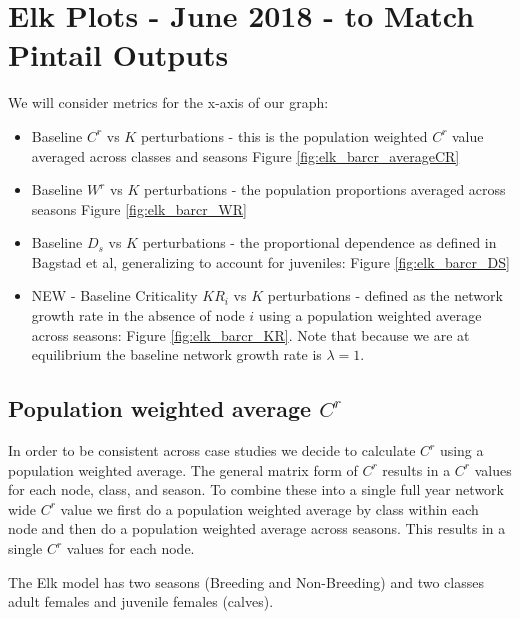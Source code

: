 \documentclass[10pt]{article}
\begin{document}
\section{Elk Plots - June 2018 - to Match Pintail Outputs}

We will consider metrics for the x-axis of our graph:
\begin{itemize}
\item Baseline $C^r$ vs $K$ perturbations - this is the population weighted $C^r$ value averaged across classes and seasons Figure \ref{fig:elk_barcr_averageCR}
\item Baseline $W^r$ vs $K$ perturbations - the population proportions averaged across seasons Figure \ref{fig:elk_barcr_WR}
\item Baseline $D_s$ vs $K$ perturbations - the proportional dependence as defined in Bagstad et al, generalizing to account for juveniles: Figure \ref{fig:elk_barcr_DS}
\item NEW - Baseline Criticality $KR_i$ vs $K$ perturbations - defined as the network growth rate in the absence of node $i$ using a population weighted average across seasons: Figure \ref{fig:elk_barcr_KR}. Note that because we are at equilibrium the baseline network growth rate is $\lambda = 1$.
\end{itemize}

\newpage
\subsection{Population weighted average \texorpdfstring{$C^r$}{CR}}

In order to be consistent across case studies we decide to calculate $C^r$ using a population weighted average. The general matrix form of $C^r$ results in a $C^r$ values for each node, class, and season. To combine these into a single full year network wide $C^r$ value we first do a population weighted average by class within each node and then do a population weighted average across seasons. This results in a single $C^r$ values for each node.

The Elk model has two seasons (Breeding and Non-Breeding) and two classes adult females and juvenile females (calves).
\end{document}
